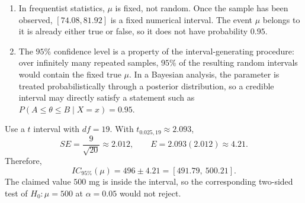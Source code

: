 \begin{solproblema}[prob:a3ef454]
\begin{enumerate}[label=(\alph*)]
	\item In frequentist statistics, $\mu$ is fixed, not random. Once the sample has been observed, $[74.08,81.92]$ is a fixed numerical interval. The event $\mu$ belongs to it is already either true or false, so it does not have probability $0.95$.
	\item The $95\%$ confidence level is a property of the interval-generating procedure: over infinitely many repeated samples, $95\%$ of the resulting random intervals would contain the fixed true $\mu$. In a Bayesian analysis, the parameter is treated probabilistically through a posterior distribution, so a credible interval may directly satisfy a statement such as $P(A\le\theta\le B\mid X=x)=0.95$.
\end{enumerate}
\end{solproblema}

\begin{solproblema}[prob:18d6b96]
Use a $t$ interval with $df=19$. With $t_{0.025,19}\approx2.093$,
\[
	SE=\frac9{\sqrt{20}}\approx2.012,\qquad
	E=2.093(2.012)\approx4.21.
\]
Therefore,
\[
	IC_{95\%}(\mu)=496\pm4.21=[491.79,\ 500.21].
\]
The claimed value $500$ mg is inside the interval, so the corresponding two-sided test of $H_0:\mu=500$ at $\alpha=0.05$ would not reject.
\end{solproblema}
